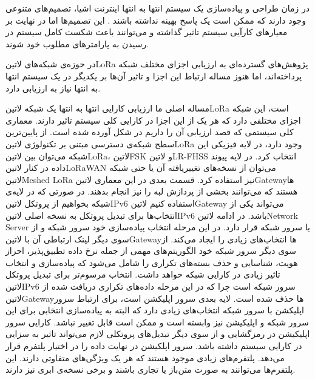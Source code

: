 
در زمان طراحی و پیاده‌سازی یک سیستم انتها به انتها اینترنت اشیا، تصمیم‌های متنوعی وجود دارند که ممکن است
یک پاسخ بهینه نداشته باشند . این تصمیم‌ها اما در نهایت بر معیارهای کارآیی سیستم تاثیر گذاشته و می‌توانند
باعث شکست کامل سیستم در رسیدن به پارامترهای مطلوب خود شوند.

در حوزه‌ی شبکه‌های ‌لاتین{LoRa} پژوهش‌های گسترده‌ای به ارزیابی اجزای مختلف شبکه پرداخته‌اند، اما هنوز
مساله ارتباط این اجزا و تاثیر آن‌ها بر یکدیگر در یک سیستم انتها به انتها نیاز به ارزیابی دارد.


مساله اصلی ما ارزیابی کارایی انتها به انتها یک شبکه ‌لاتین{LoRa} است، این شبکه اجزای مختلفی دارد که هر یک از این اجزا در کارایی کلی سیستم تاثیر دارند.
معماری کلی سیستمی که قصد ارزیابی آن را داریم در شکل  آورده شده است.
از پایین‌ترین سطح شبکه‌ی دسترسی مبتنی بر تکنولوژی ‌لاتین{LoRa} وجود دارد، در لایه فیزیکی این شبکه می‌توان بین ‌لاتین{LoRa}، ‌لاتین{FSK}
و ‌لاتین{LR-FHSS} انتخاب کرد. در لایه پیوند داده در کنار ‌لاتین{LoRaWAN} می‌توان از نسخه‌های تغییریافته آن یا حتی شبکه ‌لاتین{Meshed LoRa} نیز استفاده کرد.
قسمت بعدی در این معماری ‌لاتین{Gateway}ها هستند که می‌توانند بخشی از پردازش لبه را نیز انجام بدهند. در صورتی که در لایه‌ی شبکه بخواهیم از پروتکل ‌لاتین{IPv6} استفاده کنیم
‌لاتین{Gateway} می‌تواند یکی از انتخاب‌ها برای تبدیل پروتکل به نسخه اصلی ‌لاتین{IPv6} باشد.
در ادامه ‌لاتین{Network Server} یا سرور شبکه قرار دارد. در این مرحله انتخاب پیاده‌سازی خود سرور شبکه و از سوی دیگر لینک ارتباطی آن با
‌لاتین{Gateway}ها انتخاب‌های زیادی را ایجاد می‌کند. از سوی دیگر سرور شبکه خود الگوریتم‌های مهمی از جمله نرخ داده تطبیق‌پذیر، احراز هویت، شناسایی و حذف بسته‌های تکراری را شامل می‌شود
که پیاده‌سازی و انتخاب تاثیر زیادی در کارایی شبکه خواهد داشت. انتخاب مرسوم‌تر برای تبدیل پروتکل ‌لاتین{IPv6} سرور شبکه است چرا که در این مرحله داده‌های تکراری دریافت شده از
‌لاتین{Gateway}ها حذف شده است.
لایه بعدی سرور اپلیکشن است، برای ارتباط سرور اپلیکشن با سرور شبکه انتخاب‌های زیادی دارد که البته به پیاده‌سازی انتخابی برای این سرور شبکه و اپلیکیشن نیز وابسته است
و ممکن است قابل تغییر نباشد. کارایی سرور اپلیکیشن در رمزگشایی و از سوی دیگر تبدیل‌های پروتکلی لازم می‌تواند تاثیر به سزایی در کارایی سیستم داشته باشد.
سرور اپلکیشن در نهایت داده را در اختیار پلتفرم قرار می‌دهد. پلتفرم‌های زیادی موجود هستند که هر یک ویژگی‌های متفاوتی دارند.
این پلتفرم‌ها می‌توانند به صورت متن‌باز یا تجاری باشند و برخی نسخه‌ی ابری نیز دارند.
